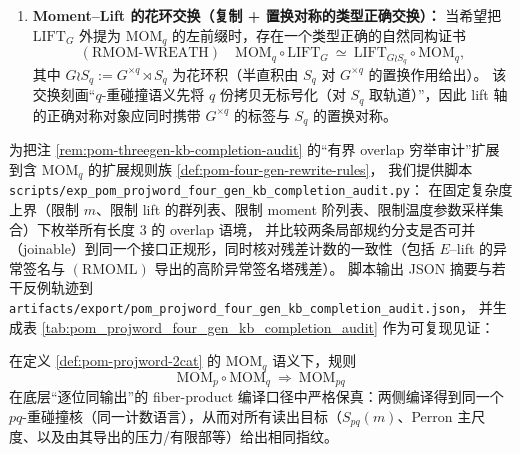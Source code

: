 \begin{definition}
\begin{enumerate}
\[  \]
  其中右端 \(\mathrm{MOM}_{\chi_1,\dots,\chi_q}\) 表示“在 \(q\) 份拷贝上分别施加 \(\mathrm{TWIST}(\chi_i)\) 后的多扭曲 moment-kernel”（其有限 \(m\) 读出满足命题 \ref{prop:pom-mom-lift-fourier-distribution} 的严格恒等式）。
  该分配律的可核对输出由高阶异常签名塔 \(\mathsf{Anom}^{(q)}_G(K;\theta)\) 组织（定义 \ref{def:pom-anom-signature-tower}）。
  \item \textbf{Moment--Lift 的花环交换（复制 + 置换对称的类型正确交换）：}
  当希望把 \(\mathrm{LIFT}_G\) 外提为 \(\mathrm{MOM}_q\) 的左前缀时，存在一个类型正确的自然同构证书
  \[
  (\mathrm{RMOM\text{-}WREATH})\quad
  \mathrm{MOM}_q\circ \mathrm{LIFT}_G
  \ \simeq\
  \mathrm{LIFT}_{G\wr S_q}\circ \mathrm{MOM}_q,
  \]
  其中
  \(G\wr S_q:=G^{\times q}\rtimes S_q\)
  为花环积（半直积由 \(S_q\) 对 \(G^{\times q}\) 的置换作用给出）。
  该交换刻画“\(q\)-重碰撞语义先将 \(q\) 份拷贝无标号化（对 \(S_q\) 取轨道）”，因此 lift 轴的正确对称对象应同时携带 \(G^{\times q}\) 的标签与 \(S_q\) 的置换对称。
\end{enumerate}
\end{definition}

\begin{remark}\label{rem:pom-fourgen-kb-completion-audit}
为把注 \ref{rem:pom-threegen-kb-completion-audit} 的“有界 overlap 穷举审计”扩展到含 \(\mathrm{MOM}_q\) 的扩展规则族 \ref{def:pom-four-gen-rewrite-rules}，
我们提供脚本
\texttt{scripts/exp\_pom\_projword\_four\_gen\_kb\_completion\_audit.py}：
在固定复杂度上界（限制 \(m\)、限制 lift 的群列表、限制 moment 阶列表、限制温度参数采样集合）下枚举所有长度 \(3\) 的 overlap 语境，
并比较两条局部规约分支是否可并（joinable）到同一个接口正规形，同时核对残差计数的一致性（包括 \(E\)--lift 的异常签名与 \((\mathrm{RMOML})\) 导出的高阶异常签名塔残差）。
脚本输出 JSON 摘要与若干反例轨迹到
\texttt{artifacts/export/pom\_projword\_four\_gen\_kb\_completion\_audit.json}，
并生成表 \ref{tab:pom_projword_four_gen_kb_completion_audit} 作为可复现见证：

\end{remark}

\begin{proposition}\label{prop:pom-rmom-sound}
在定义 \ref{def:pom-projword-2cat} 的 \(\mathrm{MOM}_q\) 语义下，规则
\[
\mathrm{MOM}_p\circ \mathrm{MOM}_q\ \Rightarrow\ \mathrm{MOM}_{pq}
\]
在底层“逐位同输出”的 fiber-product 编译口径中严格保真：两侧编译得到同一个 \(pq\)-重碰撞核（同一计数语言），从而对所有读出目标（\(S_{pq}(m)\)、Perron 主尺度、以及由其导出的压力/有限部等）给出相同指纹。
\end{proposition}

